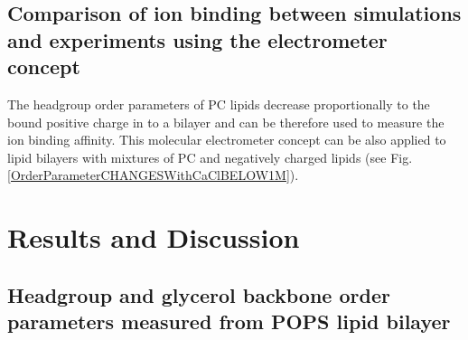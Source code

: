 \documentclass[aps,prl,superscriptaddress,twocolumn]{revtex4}
\begin{document}
\subsection{Comparison of ion binding between simulations and experiments using the electrometer concept}

The headgroup order parameters of PC lipids
decrease proportionally to the bound positive
charge in to a bilayer \cite{seelig87,catte16} and can be
therefore used to measure the ion binding
affinity. This molecular electrometer concept can
be also applied to lipid bilayers with mixtures
of PC and negatively charged lipids \cite{borle85,macdonald87,roux90}
(see Fig. \ref{OrderParameterCHANGESWithCaClBELOW1M}).
%
%





\section{Results and Discussion}

\subsection{Headgroup and glycerol backbone order parameters measured from POPS lipid bilayer}
\end{document}
